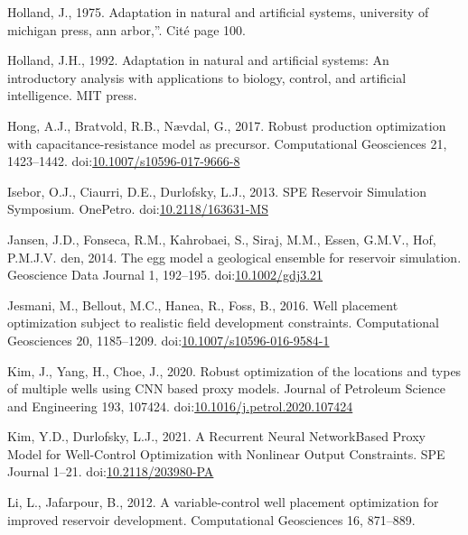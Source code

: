 \documentclass[]{elsarticle} %
\newlength{\cslhangindent}
\newenvironment{CSLReferences}[2] %
 {%
  \setlength{\parindent}{0pt}
  \ifodd #1 \everypar{\setlength{\hangindent}{\cslhangindent}}\ignorespaces\fi
  \ifnum #2 > 0
  \setlength{\parskip}{#2\baselineskip}
  \fi
 }%
 {}
\begin{document}
\begin{CSLReferences}{1}{0}
\leavevmode{}%
Holland, J., 1975. Adaptation in natural and artificial systems, university of michigan press, ann arbor,{''}. Cité page 100.

\leavevmode{}%
Holland, J.H., 1992. Adaptation in natural and artificial systems: An introductory analysis with applications to biology, control, and artificial intelligence. MIT press.

\leavevmode{}%
Hong, A.J., Bratvold, R.B., Nævdal, G., 2017. Robust production optimization with capacitance-resistance model as precursor. Computational Geosciences 21, 1423--1442. doi:\href{https://doi.org/10.1007/s10596-017-9666-8}{10.1007/s10596-017-9666-8}

\leavevmode{}%
Isebor, O.J., Ciaurri, D.E., Durlofsky, L.J., 2013. SPE Reservoir Simulation Symposium. OnePetro. doi:\href{https://doi.org/10.2118/163631-MS}{10.2118/163631-MS}

\leavevmode{}%
Jansen, J.D., Fonseca, R.M., Kahrobaei, S., Siraj, M.M., Essen, G.M.V., Hof, P.M.J.V. den, 2014. The egg model {\textendash} a geological ensemble for reservoir simulation. Geoscience Data Journal 1, 192--195. doi:\href{https://doi.org/10.1002/gdj3.21}{10.1002/gdj3.21}

\leavevmode{}%
Jesmani, M., Bellout, M.C., Hanea, R., Foss, B., 2016. Well placement optimization subject to realistic field development constraints. Computational Geosciences 20, 1185--1209. doi:\href{https://doi.org/10.1007/s10596-016-9584-1}{10.1007/s10596-016-9584-1}

\leavevmode{}%
Kim, J., Yang, H., Choe, J., 2020. Robust optimization of the locations and types of multiple wells using CNN based proxy models. Journal of Petroleum Science and Engineering 193, 107424. doi:\href{https://doi.org/10.1016/j.petrol.2020.107424}{10.1016/j.petrol.2020.107424}

\leavevmode{}%
Kim, Y.D., Durlofsky, L.J., 2021. A Recurrent Neural Network{\textendash}Based Proxy Model for Well-Control Optimization with Nonlinear Output Constraints. SPE Journal 1--21. doi:\href{https://doi.org/10.2118/203980-PA}{10.2118/203980-PA}

\leavevmode{}%
Li, L., Jafarpour, B., 2012. A variable-control well placement optimization for improved reservoir development. Computational Geosciences 16, 871--889.


\end{CSLReferences}
\end{document}
